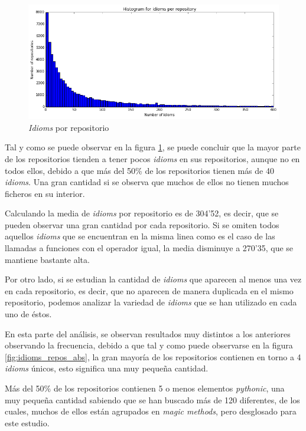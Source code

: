 \documentclass[a4paper, 12pt]{book}
\begin{document}
\begin{figure}[t]
\centering
\includegraphics[width=140mm]{img/graphs/idioms_per_repository.png}
\caption{\textit{Idioms} por repositorio}
\label{fig:idiom_per_repo}
\end{figure}

Tal y como se puede observar en la figura \ref{fig:idiom_per_repo}, se puede concluir que la mayor parte de los repositorios tienden a tener pocos \textit{idioms} en sus repositorios, aunque no en todos ellos, debido a que más del 50\% de los repositorios tienen más de 40 \textit{idioms}. Una gran cantidad si se observa que muchos de ellos no tienen muchos ficheros en su interior.

Calculando la media de \textit{idioms} por repositorio es de 304'52, es decir, que se pueden observar una gran cantidad por cada repositorio. Si se omiten todos aquellos \textit{idioms} que se encuentran en la misma linea como es el caso de las llamadas a funciones con el operador igual, la media disminuye a 270'35, que se mantiene bastante alta.

Por otro lado, si se estudian la cantidad de \textit{idioms} que aparecen al menos una vez en cada repositorio, es decir, que no aparecen de manera duplicada en el mismo repositorio, podemos analizar la variedad de \textit{idioms} que se han utilizado en cada uno de éstos.

En esta parte del análisis, se observan resultados muy distintos a los anteriores observando la frecuencia, debido a que tal y como puede observarse en la figura \ref{fig:idioms_repos_abs}, la gran mayoría de los repositorios contienen en torno a 4 \textit{idioms} únicos, esto significa una muy pequeña cantidad.

Más del 50\% de los repositorios contienen 5 o menos elementos \textit{pythonic}, una muy pequeña cantidad sabiendo que se han buscado más de 120 diferentes, de los cuales, muchos de ellos están agrupados en \textit{magic methods}, pero desglosado para este estudio.
\end{document}
